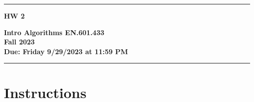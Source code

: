 \documentclass[letter,11pt]{article}
\begin{document}
\noindent\rule[2mm]{\textwidth}{1.5mm}
\noindent
\begin{minipage}{.3\textwidth}
  \vspace{-3mm}
  {\Huge\bf HW 2}
\end{minipage}\hfill\begin{minipage}{.5\textwidth}
\begin{flushright}
  {\bf Intro Algorithms EN.601.433 \\
  Fall 2023 \\
  Due: Friday 9/29/2023 at 11:59 PM}%
\vspace{3mm}
\end{flushright}
\end{minipage}
\noindent\rule{\textwidth}{1.5mm}

\section*{Instructions}
\end{document}
